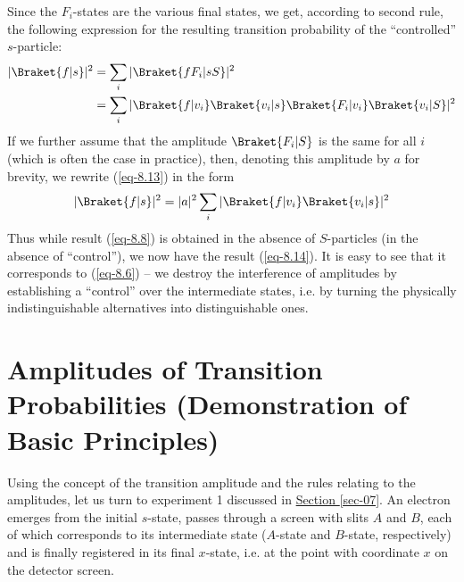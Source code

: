 \documentclass[a4paper,sfsidenotes,colorlinks=true]{tufte-book}
\numberwithin{equation}{section}
\numberwithin{figure}{section}
\begin{document}
Since the $F_{i}$-states are the various final states, we get,
according to second rule, the following expression for the resulting
transition probability of the ``controlled'' $s$-particle:
\begin{equation}%
\begin{split}
|\Braket{f|s}|^{2} & = \sum_{i} |\Braket{fF_{i}| sS}|^{2}\\
& = \sum_{i}
|\Braket{f|v_{i}}\Braket{v_{i}|s}\Braket{F_{i}|v_{i}}\Braket{v_{i}|S}
|^{2}
\end{split}
\label{eq-8.13}
\end{equation}
If we further assume that the amplitude $\Braket{F_{i} |S}$ is the
same for all $i$ (which is often the case in practice), then, denoting
this amplitude by $a$ for brevity, we rewrite (\ref{eq-8.13}) in the form
\begin{equation}%
|\Braket{f|s}|^{2} = |a|^{2} \sum_{i} |\Braket{f|v_{i}}\Braket{v_{i}|s}|^{2}
\label{eq-8.14}
\end{equation}
Thus while result (\ref{eq-8.8}) is obtained in the absence of
$S$-particles (in the absence of ``control''), we now have the result
(\ref{eq-8.14}). It is easy to see that it corresponds to (\ref{eq-8.6}) -- we destroy the interference of amplitudes by establishing a ``control'' over the intermediate states, i.e. by turning the physically indistinguishable alternatives into distinguishable ones.




\section{Amplitudes of Transition Probabilities (Demonstration of
  Basic Principles)}
\label{sec-09}



Using  the concept of the transition
amplitude and the rules relating to the amplitudes, let us turn to
experiment 1 discussed in \hyperref[sec-07]{Section \ref{sec-07}}. An
electron emerges from the initial $s$-state, passes through a screen
with slits $A$ and $B$, each of which corresponds to its intermediate
state ($A$-state and $B$-state, respectively) and is finally registered in
its final $x$-state, i.e. at the point with coordinate $x$ on the detector
screen.
\end{document}
